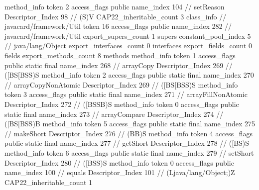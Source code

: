 {{{{{				}
				method_info {
					token	2
					access_flags	public
					name_index	104		// setReason
					Descriptor_Index	98		// (S)V
				}
			}
			CAP22_inheritable_count	3
		}
		class_info {		// javacard/framework/Util
			token	16
			access_flags	public
			name_index	282		// javacard/framework/Util
			export_supers_count	1
			supers {
				constant_pool_index	5		// java/lang/Object
			}
			export_interfaces_count	0
			interfaces {
			}
			export_fields_count	0
			fields {
			}
			export_methods_count	8
			methods {
				method_info {
					token	1
					access_flags	public static final
					name_index	268		// arrayCopy
					Descriptor_Index	269		// ([BS[BSS)S
				}
				method_info {
					token	2
					access_flags	public static final
					name_index	270		// arrayCopyNonAtomic
					Descriptor_Index	269		// ([BS[BSS)S
				}
				method_info {
					token	3
					access_flags	public static final
					name_index	271		// arrayFillNonAtomic
					Descriptor_Index	272		// ([BSSB)S
				}
				method_info {
					token	0
					access_flags	public static final
					name_index	273		// arrayCompare
					Descriptor_Index	274		// ([BS[BSS)B
				}
				method_info {
					token	5
					access_flags	public static final
					name_index	275		// makeShort
					Descriptor_Index	276		// (BB)S
				}
				method_info {
					token	4
					access_flags	public static final
					name_index	277		// getShort
					Descriptor_Index	278		// ([BS)S
				}
				method_info {
					token	6
					access_flags	public static final
					name_index	279		// setShort
					Descriptor_Index	280		// ([BSS)S
				}
				method_info {
					token	0
					access_flags	public
					name_index	100		// equals
					Descriptor_Index	101		// (Ljava/lang/Object;)Z
				}
			}
			CAP22_inheritable_count	1
		}
	}
}
